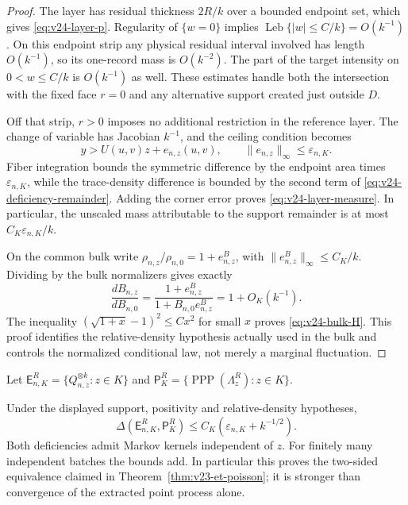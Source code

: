 \begin{proof}
The layer has residual thickness \(2R/k\) over a bounded endpoint set,
which gives \eqref{eq:v24-layer-p}.  Regularity of \(\{w=0\}\) implies
\(\operatorname{Leb}\{|w|\le C/k\}=O(k^{-1})\).  On this endpoint strip
any physical residual interval involved has length \(O(k^{-1})\), so its
one-record mass is \(O(k^{-2})\).  The part of the target intensity on
\(0<w\le C/k\) is \(O(k^{-1})\) as well.  These estimates handle both
the intersection with the fixed face \(r=0\) and any alternative support
created just outside \(D\).

Off that strip, \(r>0\) imposes no additional restriction in the reference
layer.  The change of variable has Jacobian \(k^{-1}\), and the ceiling
condition becomes
\[
                         y>U(u,v)z+e_{n,z}(u,v),
             \qquad \|e_{n,z}\|_\infty\le\varepsilon_{n,K}.
\]
Fiber integration bounds the symmetric difference by the endpoint area
times \(\varepsilon_{n,K}\), while the trace-density difference is
bounded by the second term of \eqref{eq:v24-deficiency-remainder}.  Adding
the corner error proves \eqref{eq:v24-layer-measure}.  In particular, the
unscaled mass attributable to the support remainder is at most
\(C_K\varepsilon_{n,K}/k\).

On the common bulk write \(\rho_{n,z}/\rho_{n,0}=1+e_{n,z}^B\), with
\(\|e_{n,z}^B\|_\infty\le C_K/k\).  Dividing by the bulk normalizers
gives exactly
\[
 \frac{dB_{n,z}}{dB_{n,0}}=
       \frac{1+e_{n,z}^B}{1+B_{n,0}e_{n,z}^B}=1+O_K(k^{-1}).
\]
The inequality \((\sqrt{1+x}-1)^2\le Cx^2\) for small \(x\) proves
\eqref{eq:v24-bulk-H}.  This proof identifies the relative-density
hypothesis actually used in the bulk and controls the normalized conditional
law, not merely a marginal fluctuation.
\end{proof}

Let \(\mathsf E_{n,K}^R=\{Q_{n,z}^{\otimes k}:z\in K\}\) and
\(\mathsf P_K^R=\{\operatorname{PPP}(\Lambda_z^R):z\in K\}\).

\begin{theorem}
\label{thm:v24-two-sided-deficiency}
Under the displayed support, positivity and relative-density hypotheses,
\begin{equation}\label{eq:v24-LeCam-bound}
 \Delta(\mathsf E_{n,K}^R,\mathsf P_K^R)
          \le C_K(\varepsilon_{n,K}+k^{-1/2}).
\end{equation}
Both deficiencies admit Markov kernels independent of \(z\).  For finitely
many independent batches the bounds add.  In particular this proves the
two-sided equivalence claimed in Theorem~\ref{thm:v23-et-poisson}; it is
stronger than convergence of the extracted point process alone.
\end{theorem}

